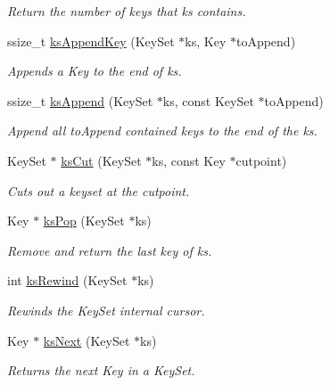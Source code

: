 \begin{DoxyCompactItemize}
\begin{DoxyCompactList}\small\item\em Return the number of keys that {\ttfamily ks} contains. \end{DoxyCompactList}\item 
ssize\-\_\-t \hyperlink{group__keyset_gaa5a1d467a4d71041edce68ea7748ce45}{ks\-Append\-Key} (Key\-Set $\ast$ks, Key $\ast$to\-Append)
\begin{DoxyCompactList}\small\item\em Appends a Key to the end of {\ttfamily ks}. \end{DoxyCompactList}\item 
ssize\-\_\-t \hyperlink{group__keyset_ga21eb9c3a14a604ee3a8bdc779232e7b7}{ks\-Append} (Key\-Set $\ast$ks, const Key\-Set $\ast$to\-Append)
\begin{DoxyCompactList}\small\item\em Append all {\ttfamily to\-Append} contained keys to the end of the {\ttfamily ks}. \end{DoxyCompactList}\item 
Key\-Set $\ast$ \hyperlink{group__keyset_ga6b00cf82b59af4d883a9bad6cf4a4a4a}{ks\-Cut} (Key\-Set $\ast$ks, const Key $\ast$cutpoint)
\begin{DoxyCompactList}\small\item\em Cuts out a keyset at the cutpoint. \end{DoxyCompactList}\item 
Key $\ast$ \hyperlink{group__keyset_gae42530b04defb772059de0600159cf69}{ks\-Pop} (Key\-Set $\ast$ks)
\begin{DoxyCompactList}\small\item\em Remove and return the last key of {\ttfamily ks}. \end{DoxyCompactList}\item 
int \hyperlink{group__keyset_gabe793ff51f1728e3429c84a8a9086b70}{ks\-Rewind} (Key\-Set $\ast$ks)
\begin{DoxyCompactList}\small\item\em Rewinds the Key\-Set internal cursor. \end{DoxyCompactList}\item 
Key $\ast$ \hyperlink{group__keyset_ga317321c9065b5a4b3e33fe1c399bcec9}{ks\-Next} (Key\-Set $\ast$ks)
\begin{DoxyCompactList}\small\item\em Returns the next Key in a Key\-Set. \end{DoxyCompactList}\item 

\end{DoxyCompactItemize}
